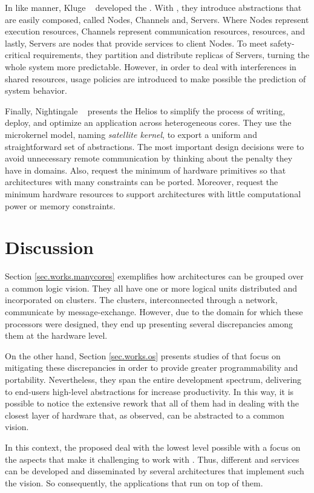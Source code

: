 	In like manner, Kluge \etal~\cite{kluge2014} developed the \moosca.
	With \moosca, they introduce abstractions that are easily composed, called Nodes,
	Channels and, Servers.
	Where Nodes represent execution resources, Channels represent communication
	resources, \eg \noc resources, and lastly, Servers are nodes that provide
	services to client Nodes.
	To meet safety-critical requirements, they partition \manycore and distribute
	replicas of Servers, turning the whole system more predictable.
	However, in order to deal with interferences in shared resources,
	usage policies are introduced to make possible the prediction of system behavior.

	Finally, Nightingale \etal~\cite{nightingale2009} presents the Helios \os to
	simplify the process of writing, deploy, and optimize an application across
	heterogeneous cores.
	They use the microkernel model, naming \textit{satellite kernel}, to export
	a uniform and straightforward set of \os abstractions.
	The most important design decisions were to avoid unnecessary remote communication
	by thinking about the penalty they have in \numa domains.
	Also, request the minimum of hardware primitives so that architectures with many
	constraints can be ported.
	Moreover, request the minimum hardware resources to support architectures with little
	computational power or memory constraints.

\section{Discussion}

	Section \ref{sec.works.manycores} exemplifies how \manycore architectures can be
	grouped over a common logic vision.
	They all have one or more logical units distributed and incorporated on clusters.
	The clusters, interconnected through a network, communicate by message-exchange.
	However, due to the domain for which these processors were designed, they end up
	presenting several discrepancies among them at the hardware level.

	On the other hand, Section \ref{sec.works.os} presents studies of \oses that focus on
	mitigating these discrepancies in order to provide greater programmability and portability.
	Nevertheless, they span the entire development spectrum, delivering to end-users
	high-level abstractions for increase productivity.
	In this way, it is possible to notice the extensive rework that all of them had in
	dealing with the closest layer of hardware that, as observed, can be abstracted to
	a common vision.

	In this context, the proposed \hal deal with the lowest level possible with a focus
	on the aspects that make it challenging to work with \manycores.
	Thus, different \oses and services can be developed and disseminated by several
	architectures that implement such the vision.
	So consequently, the applications that run on top of them.